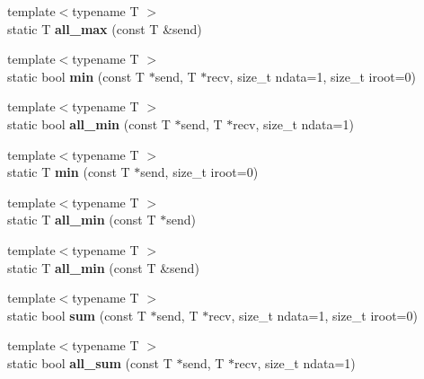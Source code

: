 \begin{DoxyCompactItemize}
\item 
{\footnotesize template$<$typename T $>$ }\\static T {\bfseries all\+\_\+max} (const T \&send)\hypertarget{structmpi_ab5bfe3cdce9e87bec1728a05dbdc1595}{}\label{structmpi_ab5bfe3cdce9e87bec1728a05dbdc1595}

\item 
{\footnotesize template$<$typename T $>$ }\\static bool {\bfseries min} (const T $\ast$send, T $\ast$recv, size\+\_\+t ndata=1, size\+\_\+t iroot=0)\hypertarget{structmpi_ac7a214ea2c48c474b8501bcebaeca185}{}\label{structmpi_ac7a214ea2c48c474b8501bcebaeca185}

\item 
{\footnotesize template$<$typename T $>$ }\\static bool {\bfseries all\+\_\+min} (const T $\ast$send, T $\ast$recv, size\+\_\+t ndata=1)\hypertarget{structmpi_af2125d3ea819924ff37306c8774fc15f}{}\label{structmpi_af2125d3ea819924ff37306c8774fc15f}

\item 
{\footnotesize template$<$typename T $>$ }\\static T {\bfseries min} (const T $\ast$send, size\+\_\+t iroot=0)\hypertarget{structmpi_a753f41b28c7db7254387bd00620bebf9}{}\label{structmpi_a753f41b28c7db7254387bd00620bebf9}

\item 
{\footnotesize template$<$typename T $>$ }\\static T {\bfseries all\+\_\+min} (const T $\ast$send)\hypertarget{structmpi_ac8b8ce1586a9398902d1ab48270d3714}{}\label{structmpi_ac8b8ce1586a9398902d1ab48270d3714}

\item 
{\footnotesize template$<$typename T $>$ }\\static T {\bfseries all\+\_\+min} (const T \&send)\hypertarget{structmpi_a9941e65f36dbcf11f4a5cf3adf6f235d}{}\label{structmpi_a9941e65f36dbcf11f4a5cf3adf6f235d}

\item 
{\footnotesize template$<$typename T $>$ }\\static bool {\bfseries sum} (const T $\ast$send, T $\ast$recv, size\+\_\+t ndata=1, size\+\_\+t iroot=0)\hypertarget{structmpi_ac29de348f5b29b4f1e273e3ee99265f9}{}\label{structmpi_ac29de348f5b29b4f1e273e3ee99265f9}

\item 
{\footnotesize template$<$typename T $>$ }\\static bool {\bfseries all\+\_\+sum} (const T $\ast$send, T $\ast$recv, size\+\_\+t ndata=1)\hypertarget{structmpi_a634c4bf3a3654980224929347850eaf0}{}\label{structmpi_a634c4bf3a3654980224929347850eaf0}


\end{DoxyCompactItemize}
